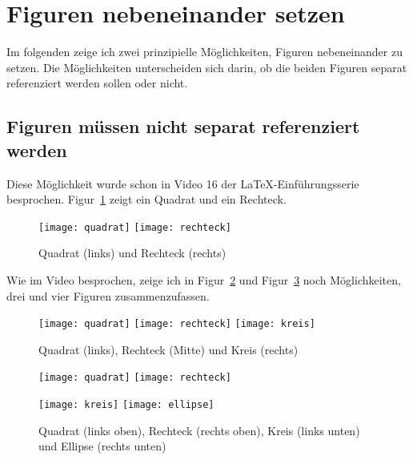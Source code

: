 \documentclass[12pt,a4paper]{scrartcl}
\newcommand{\figref}[1]{Figur~\ref{#1}}
\begin{document}
%
\tableofcontents
\listoffigures
%
\section{Figuren nebeneinander setzen}
Im folgenden zeige ich zwei prinzipielle Möglichkeiten, Figuren
nebeneinander zu setzen. Die Möglichkeiten unterscheiden sich darin,
ob die beiden Figuren separat referenziert werden sollen oder nicht.
%
\subsection{Figuren müssen nicht separat referenziert werden}
Diese Möglichkeit wurde schon in Video 16 der \LaTeX-Einführungsserie
besprochen. \figref{fig:quad_recht} zeigt ein Quadrat und ein Rechteck.
%
\begin{figure}[ht]
  \centering
  \texttt{[image: quadrat]}   
  \texttt{[image: rechteck]}  
  \caption[Geometrische Figuren (zwei nebeneinander)]{Quadrat (links)
    und Rechteck (rechts)}
  \label{fig:quad_recht}
\end{figure}
%
Wie im Video besprochen, zeige ich in \figref{fig:drei_fig} und
\figref{fig:vier_fig} noch Möglichkeiten, drei und vier Figuren
zusammenzufassen.
%
\begin{figure}[ht]
  \centering
  \texttt{[image: quadrat]}  
  \texttt{[image: rechteck]}
  \texttt{[image: kreis]}  
  \caption[Geometrische Figuren (drei nebeneinander)]{Quadrat
    (links), Rechteck (Mitte) und Kreis (rechts)}
  \label{fig:drei_fig}
\end{figure}
%
\begin{figure}[ht]
  \centering
  \texttt{[image: quadrat]}  
  \texttt{[image: rechteck]}

  \texttt{[image: kreis]}  
  \texttt{[image: ellipse]}  
  \caption[Geometrische Figuren (vier als Quadrat angeordnet)]{Quadrat
    (links oben), Rechteck (rechts oben), Kreis (links unten) und
    Ellipse (rechts unten)}
  \label{fig:vier_fig}
\end{figure}
%
\end{document}
